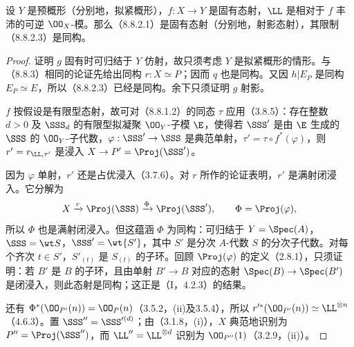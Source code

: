  设 $Y$ 是预概形（分别地，拟紧概形），$f:X\to Y$ 是固有态射，$\LL$ 是相对于 $f$ 丰沛的可逆 $\OO_X$-模。那么（8.8.2.1）是固有态射（分别地，射影态射），其限制（8.8.2.3）是同构。
\begin{proof}
证明 $g$ 固有时可归结于 $Y$ 仿射，故只须考虑 $Y$ 是拟紧概形的情形。与（8.8.3）相同的论证先给出同构 $r:X\simeq P$；因而 $q$ 也是同构。又因 $h|E_P$ 是同构 $E_P\simeq E$，所以（8.8.2.3）已经是同构。余下只须证明 $g$ 射影。

$f$ 按假设是有限型态射，故可对（8.8.1.2）的同态 $\tau$ 应用（3.8.5）：存在整数 $d>0$ 及 $\SSS_d$ 的有限型拟凝聚 $\OO_Y$-子模 $\E$，使得若 $\SSS'$ 是由 $\E$ 生成的 $\SSS$ 的 $\OO_Y$-子代数，$\varphi:\SSS'\to\SSS$ 是典范单射，$\tau'=\tau\circ f^*(\varphi)$，则 $r'=r_{\LL,\tau'}$ 是浸入 $X\to P'=\Proj(\SSS')$。

因为 $\varphi$ 单射，$r'$ 还是占优浸入（3.7.6）。对 $r$ 所作的论证表明，$r'$ 是满射闭浸入。它分解为
\[X\xrightarrow{r}\Proj(\SSS)\xrightarrow{\Phi}\Proj(\SSS'),\qquad\Phi=\Proj(\varphi),\]
所以 $\Phi$ 也是满射闭浸入。但这蕴涵 $\Phi$ 为同构：可归结于 $Y=\Spec(A)$，$\SSS=\wt S$，$\SSS'=\wt{S'}$，其中 $S'$ 是分次 $A$-代数 $S$ 的分次子代数。对每个齐次 $t\in S'$，$S'_{(t)}$ 是 $S_{(t)}$ 的子环。回顾 $\Proj(\varphi)$ 的定义（2.8.1），只须证明：若 $B'$ 是 $B$ 的子环，且由单射 $B'\to B$ 对应的态射 $\Spec(B)\to\Spec(B')$ 是闭浸入，则此态射是同构；这正是（I，4.2.3）的结果。

还有 $\Phi^*(\OO_{P'}(n))=\OO_P(n)$（3.5.2，(ii)及3.5.4），所以 $r'^*(\OO_{P'}(n))\simeq\LL^{\otimes n}$（4.6.3）。置 $\SSS''=\SSS'^{(d)}$；由（3.1.8，(i)），$X$ 典范地识别为 $P''=\Proj(\SSS'')$，而 $\LL''=\LL^{\otimes d}$ 识别为 $\OO_{P''}(1)$（3.2.9，(ii)）。


\end{proof}
